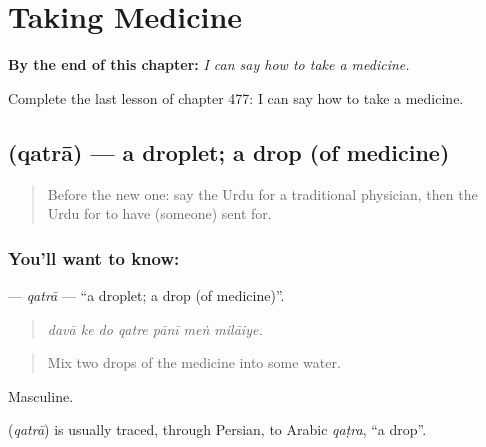
\chapter{Taking Medicine}
\label{ch:ur-taking-medicine}

\begin{chapteropening}
\textbf{By the end of this chapter:} \emph{I can say how to take a medicine.}

Complete the last lesson of chapter 477: I can say how to take a medicine.
\end{chapteropening}

\section[\texorpdfstring{\ur{قطرہ} (qatrā)}{قطرہ (qatrā)}]{ (qatrā) — a droplet; a drop (of medicine)}

\label{lesson:UR-C477-qatra}



\begin{quote}
Before the new one: say the Urdu for a traditional physician, then the Urdu for to have (someone) sent for.
\end{quote}

\subsection*{You'll want to know: }
\textbf{} — \emph{qatrā} — \textquotedblleft{}a droplet; a drop (of medicine)\textquotedblright{}.

\begin{quote}
      
\end{quote}

\begin{quote}
\emph{davā ke do qatre pānī meṅ milāiye.}
\end{quote}

\begin{quote}
Mix two drops of the medicine into some water.
\end{quote}

Masculine.

\begin{cousinweb}
\textbf{} (\emph{qatrā}) is usually traced, through Persian, to Arabic \emph{qaṭra}, \textquotedblleft{}a drop\textquotedblright{}.
\end{cousinweb}

